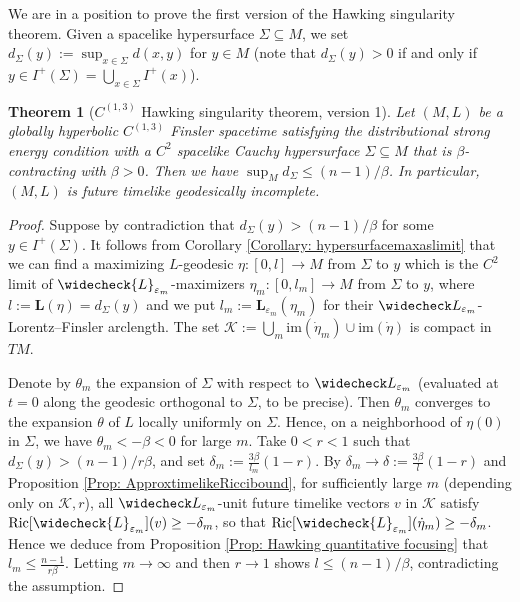 \documentclass[a4paper,11pt]{article}
\numberwithin{equation}{section}
\theoremstyle{definition}
\theoremstyle{plain}
\newtheorem{Theorem}[Definition]{Theorem}
\newcommand{\eps}{\varepsilon}
\newcommand{\Ric}{\mathrm{Ric}}
\begin{document}
We are in a position to prove the first version of the Hawking singularity theorem.
Given a spacelike hypersurface $\Sigma \subseteq M$, we set $d_\Sigma(y):=\sup_{x \in \Sigma}d(x,y)$ for $y \in M$ (note that $d_\Sigma(y)>0$ if and only if $y \in I^+(\Sigma) =\bigcup_{x \in \Sigma} I^+(x)$). 

\begin{Theorem}[$C^{(1,3)}$ Hawking singularity theorem, version 1]
\label{Theorem: unweighted Hawking 1}
Let $(M,L)$ be a globally hyperbolic $C^{(1,3)}$ Finsler spacetime satisfying the distributional strong energy condition with a $C^2$ spacelike Cauchy hypersurface $\Sigma \subseteq M$ that is $\beta$-contracting with $\beta > 0$. 
Then we have $\sup_M d_\Sigma \leq (n-1)/\beta$. 
In particular, $(M,L)$ is future timelike geodesically incomplete.
\end{Theorem}

\begin{proof}
    Suppose by contradiction that $d_\Sigma(y) > (n-1)/\beta$ for some $y \in I^+(\Sigma)$. 
    It follows from Corollary \ref{Corollary: hypersurfacemaxaslimit} that we can find a maximizing $L$-geodesic $\eta:[0,l] \to M$ from $\Sigma$ to $y$ which is the $C^2$ limit of $\widecheck{L}_{\eps_m}$-maximizers $\eta_m:[0,l_m] \to M$ from $\Sigma$ to $y$, where $l:=\mathbf L(\eta)=d_\Sigma(y)$ and we put $l_m := \mathbf L_{\eps_m}(\eta_m)$ for their $\widecheck L_{\varepsilon_m}$-Lorentz--Finsler arclength. 
    The set $\mathcal K:=\bigcup_m \mathrm{im}(\dot{\eta}_m) \cup \mathrm{im}(\dot{\eta})$ is compact in $TM$. 

    Denote by $\theta_m$ the expansion of $\Sigma$ with respect to $\widecheck L_{\eps_m}$ (evaluated at $t=0$ along the geodesic orthogonal to $\Sigma$, to be precise). 
    Then $\theta_m$ converges to the expansion $\theta$ of $L$ locally uniformly on $\Sigma$. 
    Hence, on a neighborhood of $\eta(0)$ in $\Sigma$, we have $\theta_m < -\beta < 0$ for large $m$. 
    Take $0 < r < 1$ such that $d_\Sigma(y) > (n-1)/r\beta$, and set $\delta_m:=\frac{3\beta}{l_m}(1-r)$. 
    By $\delta_m \to \delta :=\frac{3\beta}{l}(1-r)$ and Proposition \ref{Prop: ApproxtimelikeRiccibound}, for sufficiently large $m$ (depending only on $\mathcal K,r$), all $\widecheck L_{\eps_m}$-unit future timelike vectors $v$ in $\mathcal K$ satisfy $\Ric[\widecheck{L}_{\eps_m}](v) \geq -\delta_m$, so that $\Ric[\widecheck{L}_{\eps_m}](\dot{\eta}_m) \geq -\delta_m$.
    Hence we deduce from Proposition \ref{Prop: Hawking quantitative focusing} that $l_m \leq \frac{n-1}{r\beta}$. 
    Letting $m \to \infty$ and then $r \to 1$ shows $l \leq (n-1)/\beta$, contradicting the assumption.
\end{proof}
\end{document}
